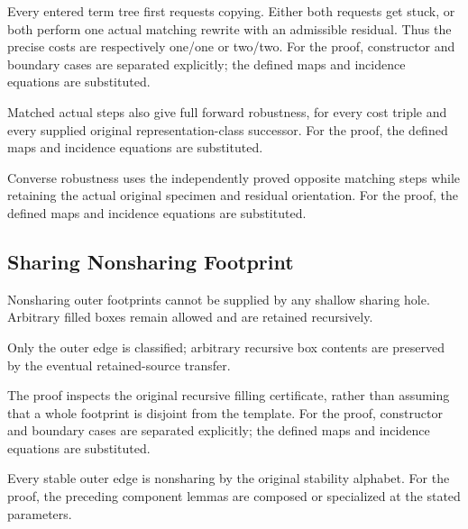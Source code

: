 Every entered term tree first requests copying. Either both requests get stuck, or both perform one actual matching rewrite with an admissible residual. Thus the precise costs are respectively one/one or two/two.
For the proof, constructor and boundary cases are separated explicitly; the defined maps and incidence equations are substituted.
\par{}

Matched actual steps also give full forward robustness, for every cost triple and every supplied original representation-class successor.
For the proof, the defined maps and incidence equations are substituted.
\par{}

Converse robustness uses the independently proved opposite matching steps while retaining the actual original specimen and residual orientation.
For the proof, the defined maps and incidence equations are substituted.
\par{}

\subsection{Sharing Nonsharing Footprint}
Nonsharing outer footprints cannot be supplied by any shallow sharing hole. Arbitrary filled boxes remain allowed and are retained recursively.

Only the outer edge is classified; arbitrary recursive box contents are preserved by the eventual retained-source transfer.
\par{}

The proof inspects the original recursive filling certificate, rather than assuming that a whole footprint is disjoint from the template.
For the proof, constructor and boundary cases are separated explicitly; the defined maps and incidence equations are substituted.
\par{}

Every stable outer edge is nonsharing by the original stability alphabet.
For the proof, the preceding component lemmas are composed or specialized at the stated parameters.
\par{}


